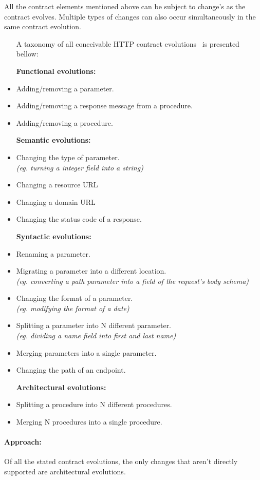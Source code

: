 All the contract elements mentioned above can be subject to change's as the contract evolves.
Multiple types of changes can also occur simultaneously in the same contract evolution.
\begin{itemize}
    \setlength\itemsep{0em}
    \item [A taxonomy of all conceivable HTTP contract evolutions~\cite{list} is presented bellow:]
    \item [\textbf{Functional evolutions:}]
    \item Adding/removing a parameter.
    \item Adding/removing a response message from a procedure.
    \item Adding/removing a procedure.
    \item [\textbf{Semantic evolutions:}]
    \item Changing the type of parameter. \\ \textit{(eg. turning a integer field into a string)}
    \item Changing a resource URL
    \item Changing a domain URL
    \item Changing the status code of a response.
    \item [\textbf{Syntactic evolutions:}]
    \item Renaming a parameter.
    \item Migrating a parameter into a different location. \\ \textit{(eg. converting a path parameter into a field of the request's body schema)}
    \item Changing the format of a parameter. \\ \textit{(eg. modifying the format of a date)}
    \item Splitting a parameter into N different parameter. \\ \textit{(eg. dividing a name field into first and last name)}
    \item Merging parameters into a single parameter.
    \item Changing the path of an endpoint.
    \item [\textbf{Architectural evolutions:}]
    \item Splitting a procedure into N different procedures.
    \item Merging N procedures into a single procedure.
\end{itemize}

\paragraph{Approach:}
Of all the stated contract evolutions, the only changes that aren't directly supported are architectural evolutions.

